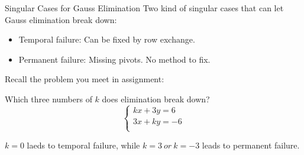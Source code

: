 \documentclass{beamer}
\begin{document}
\begin{frame}{Singular Cases for Gauss Elimination}
Two kind of singular cases that can let Gauss elimination break down:
\begin{itemize}
    \item Temporal failure: Can be fixed by row exchange.
    \item Permanent failure: Missing pivots. No method to fix.
\end{itemize}

\vspace{7pt}
Recall the problem you meet in assignment:

\vspace{5pt}
Which three numbers of $k$ does elimination break down?
\begin{equation*}
    \begin{cases}
        kx+3y=6\\
        3x+ky=-6\\
    \end{cases}
\end{equation*}

$k=0$ laeds to temporal failure, while $k=3\:or\:k=-3$ leads to permanent failure.

\end{frame}
\end{document}
